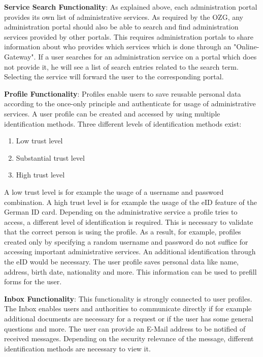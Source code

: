 \documentclass[
     12pt,         %
     a4paper,      %
     BCOR=10mm,version=first,     %
     DIV=14,version=first,        %
     ]{scrreprt}
\begin{document}
\textbf{Service Search Functionality}: 
As explained above, each administration portal provides its own list of administrative services. As required by the OZG, any administration portal should also be able to search and find administration services provided by other portals. This requires administration portals to share information about who provides which services which is done through an "Online-Gateway". \cite{BMI:Gateway}
If a user searches for an administration service on a portal which does not provide it, he will see a list of search entries related to the search term. Selecting the service will forward the user to the corresponding portal.

\textbf{Profile Functionality}:
Profiles enable users to save reusable personal data according to the once-only principle and authenticate for usage of administrative services. A user profile can be created and accessed by using multiple identification methods. Three different levels of identification methods exist:
\begin{enumerate}
    \item Low trust level
    \item Substantial trust level
    \item High trust level
\end{enumerate}
A low trust level is for example the usage of a username and password combination. A high trust level is for example the usage of the eID feature of the German ID card.
Depending on the administrative service a profile tries to access, a different level of identification is required. This is necessary to validate that the correct person is using the profile. As a result, for example, profiles created only by specifying a random username and password do not suffice for accessing important administrative services. An additional identification through the eID would be necessary.
The user profile saves personal data like name, address, birth date, nationality and more. This information can be used to prefill forms for the user. \cite{BMI:Nutzerkonto_Bund}

\textbf{Inbox Functionality}:
This functionality is strongly connected to user profiles. The Inbox enables users and authorities to communicate directly if for example additional documents are necessary for a request or if the user has some general questions and more. The user can provide an E-Mail address to be notified of received messages. Depending on the security relevance of the message, different identification methods are necessary to view it. \cite{BMI:Nutzerkonto_Bund}
\end{document}
